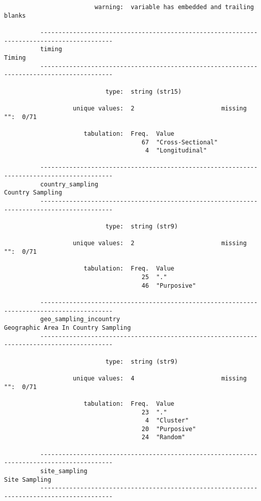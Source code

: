 \documentclass{article}
\begin{document}
\begin{verbatim}
                         warning:  variable has embedded and trailing blanks
          
          ------------------------------------------------------------------------------------------
          timing                                                                              Timing
          ------------------------------------------------------------------------------------------
          
                            type:  string (str15)
          
                   unique values:  2                        missing "":  0/71
          
                      tabulation:  Freq.  Value
                                      67  "Cross-Sectional"
                                       4  "Longitudinal"
          
          ------------------------------------------------------------------------------------------
          country_sampling                                                          Country Sampling
          ------------------------------------------------------------------------------------------
          
                            type:  string (str9)
          
                   unique values:  2                        missing "":  0/71
          
                      tabulation:  Freq.  Value
                                      25  "."
                                      46  "Purposive"
          
          ------------------------------------------------------------------------------------------
          geo_sampling_incountry                                 Geographic Area In Country Sampling
          ------------------------------------------------------------------------------------------
          
                            type:  string (str9)
          
                   unique values:  4                        missing "":  0/71
          
                      tabulation:  Freq.  Value
                                      23  "."
                                       4  "Cluster"
                                      20  "Purposive"
                                      24  "Random"
          
          ------------------------------------------------------------------------------------------
          site_sampling                                                                Site Sampling
          ------------------------------------------------------------------------------------------
          

\end{verbatim}
\end{document}
